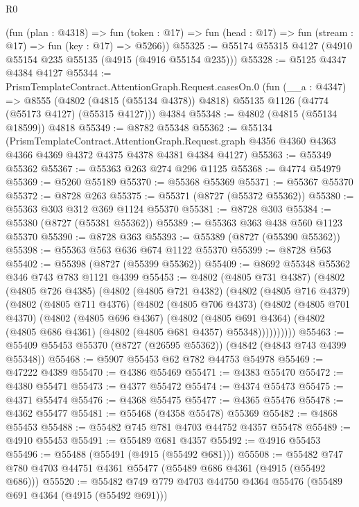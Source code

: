 \begin{lexlean}{R0}
\begin{coremodule}
      (fun (plan : @4318) =>
      fun (token : @17) => fun (head : @17) => fun (stream : @17) => fun (key : @17) => @5266))
@55325 := @55174 @55315 @4127 (@4910 @55154 @235 @55135 (@4915 (@4916 @55154 @235)))
@55328 := @5125 @4347 @4384 @4127
@55344 := PrismTemplateContract.AttentionGraph.Request.casesOn.{0}
    (fun (__a : @4347) =>
    @8555 (@4802 (@4815 (@55134 @4378)) @4818) @55135 @1126 (@4774 (@55173 @4127) (@55315 @4127)))
    @4384
@55348 := @4802 (@4815 (@55134 @18599)) @4818
@55349 := @8782 @55348
@55362 := @55134
    (PrismTemplateContract.AttentionGraph.Request.graph
      @4356
      @4360
      @4363
      @4366
      @4369
      @4372
      @4375
      @4378
      @4381
      @4384
      @4127)
@55363 := @55349 @55362
@55367 := @55363 @263 @274 @296 @1125
@55368 := @4774 @54979
@55369 := @5260 @55189
@55370 := @55368 @55369
@55371 := @55367 @55370
@55372 := @8728 @263
@55375 := @55371 (@8727 (@55372 @55362))
@55380 := @55363 @303 @312 @369 @1124 @55370
@55381 := @8728 @303
@55384 := @55380 (@8727 (@55381 @55362))
@55389 := @55363 @363 @438 @560 @1123 @55370
@55390 := @8728 @363
@55393 := @55389 (@8727 (@55390 @55362))
@55398 := @55363 @563 @636 @674 @1122 @55370
@55399 := @8728 @563
@55402 := @55398 (@8727 (@55399 @55362))
@55409 := @8692 @55348 @55362 @346 @743 @783 @1121 @4399
@55453 := @4802
    (@4805 @731 @4387)
    (@4802
      (@4805 @726 @4385)
      (@4802
        (@4805 @721 @4382)
        (@4802
          (@4805 @716 @4379)
          (@4802
            (@4805 @711 @4376)
            (@4802
              (@4805 @706 @4373)
              (@4802
                (@4805 @701 @4370)
                (@4802
                  (@4805 @696 @4367)
                  (@4802
                    (@4805 @691 @4364)
                    (@4802 (@4805 @686 @4361) (@4802 (@4805 @681 @4357) @55348))))))))))
@55463 := @55409 @55453 @55370 (@8727 (@26595 @55362)) (@4842 (@4843 @743 @4399 @55348))
@55468 := @5907 @55453 @62 @782 @44753 @54978
@55469 := @47222 @4389
@55470 := @4386 @55469
@55471 := @4383 @55470
@55472 := @4380 @55471
@55473 := @4377 @55472
@55474 := @4374 @55473
@55475 := @4371 @55474
@55476 := @4368 @55475
@55477 := @4365 @55476
@55478 := @4362 @55477
@55481 := @55468 (@4358 @55478) @55369
@55482 := @4868 @55453
@55488 := @55482 @745 @781 @4703 @44752 @4357 @55478
@55489 := @4910 @55453
@55491 := @55489 @681 @4357
@55492 := @4916 @55453
@55496 := @55488 (@55491 (@4915 (@55492 @681)))
@55508 := @55482 @747 @780 @4703 @44751 @4361 @55477 (@55489 @686 @4361 (@4915 (@55492 @686)))
@55520 := @55482 @749 @779 @4703 @44750 @4364 @55476 (@55489 @691 @4364 (@4915 (@55492 @691)))

\end{coremodule}
\end{lexlean}
